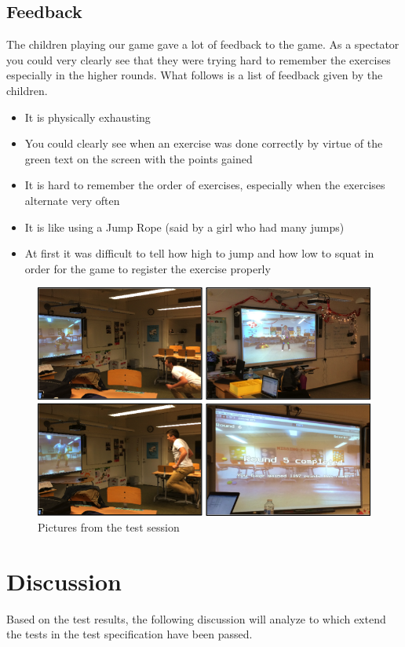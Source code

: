 \documentclass[11pt]{report}
\begin{document}
\subsection{Feedback}
The children playing our game gave a lot of feedback to the game. As a spectator you could very clearly see that they were trying hard to remember the exercises especially in the higher rounds. What follows is a list of feedback given by the children.
\begin{itemize}
\item It is physically exhausting
\item You could clearly see when an exercise was done correctly by virtue of the green text on the screen with the points gained
\item It is hard to remember the order of exercises, especially when the exercises alternate very often
\item It is like using a Jump Rope (said by a girl who had many jumps)
\item At first it was difficult to tell how high to jump and how low to squat in order for the game to register the exercise properly
\end{itemize}

\begin{figure}[H]
\centering
\includegraphics[scale=.59]{../GFX/UserTestingCollage.png}
\caption{Pictures from the test session}
\end{figure}

\section{Discussion}
Based on the test results, the following discussion will analyze to which extend the tests in the test specification have been passed.
\end{document}
